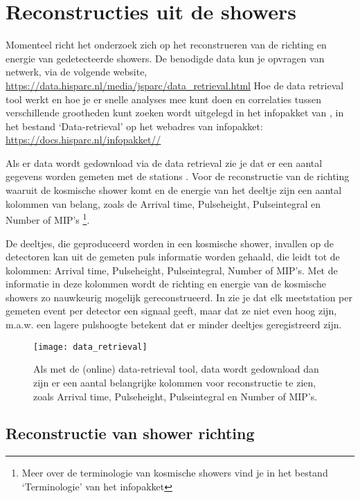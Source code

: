 \section{Reconstructies uit de showers}

Momenteel richt het \hisparc onderzoek zich op het reconstrueren
van de richting  en energie van gedetecteerde showers. De benodigde data kun je opvragen
van \hisparc netwerk, via de volgende website,
\url{https://data.hisparc.nl/media/jsparc/data_retrieval.html} Hoe de
data retrieval tool werkt en hoe je er snelle analyses mee kunt doen en
correlaties tussen verschillende grootheden kunt zoeken wordt uitgelegd
in het infopakket van \hisparc, in het bestand `Data-retrieval' op het
webadres van infopakket:
\url{https://docs.hisparc.nl/infopakket//}

Als er data wordt gedownload via de data retrieval zie je dat er een aantal
gegevens worden gemeten met de stations . Voor de
reconstructie van de richting waaruit de kosmische shower komt en de energie
van het deeltje zijn een aantal kolommen van belang, zoals de Arrival time,
Pulseheight, Pulseintegral en Number of MIP's \footnote{Meer over de terminologie
van kosmische showers vind je in het bestand `Terminologie' van het infopakket}.

De deeltjes, die geproduceerd worden in een kosmische shower, invallen op de
detectoren kan uit de gemeten puls informatie worden gehaald, die leidt tot de
kolommen: Arrival time, Pulseheight, Pulseintegral, Number of MIP's.
Met de informatie in deze kolommen wordt de richting en energie van de kosmische
showers zo nauwkeurig mogelijk gereconstrueerd. In  zie je
dat elk meetstation per gemeten event per detector een signaal geeft, maar
dat ze niet even hoog zijn, m.a.w. een lagere pulshoogte betekent dat er
minder deeltjes geregistreerd
zijn.

\begin{figure}
    \centering
    \texttt{[image: data\_retrieval]}
    \caption{Als met de (online) data-retrieval tool, data wordt gedownload dan zijn
    er een aantal belangrijke kolommen voor reconstructie te zien, zoals Arrival time,
    Pulseheight, Pulseintegral en Number of MIP's.}
    \label{fig:data_retrieval}
\end{figure}

\subsection{Reconstructie van shower richting}

